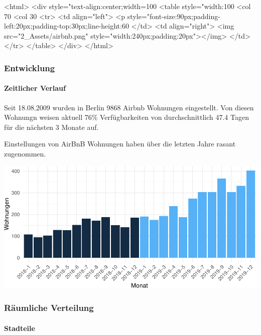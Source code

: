\documentclass[
]{article}
\author{}
\date{\vspace{-2.5em}}
\begin{document}
<html>
  <div style="text-align:center;width=100%
  <table style="width:100%
  <col 70%
  <col 30%
  <tr>
    <td align="left">
      <p style="font-size:90px;padding-left:20px;padding-top:30px;line-height:60%
    </td>
    <td align="right">
      <img src="2_Assets/airbnb.png" style="width:240px;padding:20px"></img>
    </td>
  </tr>
  </table>
  </div>
</html>

\hypertarget{entwicklung}{%
\subsubsection{Entwicklung}\label{entwicklung}}

\hypertarget{zeitlicher-verlauf}{%
\paragraph{Zeitlicher Verlauf}\label{zeitlicher-verlauf}}

Seit 18.08.2009 wurden in Berlin 9868 Airbnb Wohnungen eingestellt. Von
diesen Wohnungn weisen aktuell 76\% Verfügbarkeiten von durchschnittlich
47.4 Tagen für die nächsten 3 Monate auf.

Einstellungen von AirBnB Wohnungen haben über die letzten Jahre rasant
zugenommen.

\includegraphics{case_files/figure-latex/unnamed-chunk-1-1.pdf}

\hypertarget{ruxe4umliche-verteilung}{%
\subsubsection{Räumliche Verteilung}\label{ruxe4umliche-verteilung}}

\hypertarget{stadteile}{%
\paragraph{Stadteile}\label{stadteile}}
\end{document}
